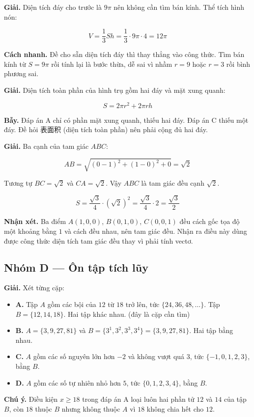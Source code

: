 \documentclass[11pt, a4paper]{article}
\begin{document}
\begin{dapan}[21 — Đáp án B]
\textbf{Giải.} Diện tích đáy cho trước là $9\pi$ nên không cần tìm bán kính. Thể tích hình nón:

$$V = \frac{1}{3}Sh = \frac{1}{3} \cdot 9\pi \cdot 4 = 12\pi$$

\textbf{Cách nhanh.} Đề cho sẵn diện tích đáy thì thay thẳng vào công thức. Tìm bán kính từ $S = 9\pi$ rồi tính lại là bước thừa, dễ sai vì nhầm $r = 9$ hoặc $r = 3$ rồi bình phương sai.
\end{dapan}

\begin{dapan}[22 — Đáp án B]
\textbf{Giải.} Diện tích toàn phần của hình trụ gồm hai đáy và mặt xung quanh:

$$S = 2\pi r^2 + 2\pi rh$$

\textbf{Bẫy.} Đáp án A chỉ có phần mặt xung quanh, thiếu hai đáy. Đáp án C thiếu một đáy. Đề hỏi 表面积 (diện tích toàn phần) nên phải cộng đủ hai đáy.
\end{dapan}

\begin{dapan}[23 — Đáp án C]
\textbf{Giải.} Ba cạnh của tam giác $ABC$:

$$AB = \sqrt{(0-1)^2 + (1-0)^2 + 0} = \sqrt{2}$$

Tương tự $BC = \sqrt{2}$ và $CA = \sqrt{2}$. Vậy $ABC$ là tam giác đều cạnh $\sqrt{2}$.

$$S = \frac{\sqrt{3}}{4} \cdot \left(\sqrt{2}\right)^2 = \frac{\sqrt{3}}{4} \cdot 2 = \frac{\sqrt{3}}{2}$$

\textbf{Nhận xét.} Ba điểm $A(1,0,0)$, $B(0,1,0)$, $C(0,0,1)$ đều cách gốc tọa độ một khoảng bằng $1$ và cách đều nhau, nên tam giác đều. Nhận ra điều này dùng được công thức diện tích tam giác đều thay vì phải tính vectơ.
\end{dapan}

\subsection*{Nhóm D — Ôn tập tích lũy}

\begin{dapan}[24 — Đáp án A]
\textbf{Giải.} Xét từng cặp:

\begin{itemize}[leftmargin=1.4em, itemsep=2pt]
\item \textbf{A.} Tập $A$ gồm các bội của $12$ từ $18$ trở lên, tức $\{24, 36, 48, \dots\}$. Tập $B = \{12, 14, 18\}$. Hai tập khác nhau. (đây là cặp cần tìm)
\item \textbf{B.} $A = \{3, 9, 27, 81\}$ và $B = \{3^1, 3^2, 3^3, 3^4\} = \{3, 9, 27, 81\}$. Hai tập bằng nhau.
\item \textbf{C.} $A$ gồm các số nguyên lớn hơn $-2$ và không vượt quá $3$, tức $\{-1, 0, 1, 2, 3\}$, bằng $B$.
\item \textbf{D.} $A$ gồm các số tự nhiên nhỏ hơn $5$, tức $\{0, 1, 2, 3, 4\}$, bằng $B$.
\end{itemize}


\textbf{Chú ý.} Điều kiện $x \ge 18$ trong đáp án A loại luôn hai phần tử $12$ và $14$ của tập $B$, còn $18$ thuộc $B$ nhưng không thuộc $A$ vì $18$ không chia hết cho $12$.
\end{dapan}
\end{document}
